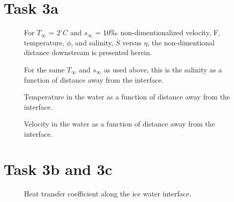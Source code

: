 \section*{Task 3a} %
\label{sec:Task 3a}
	
	\begin{figure}[h]
		\begin{center}
			\newlength\figureheight 
			\newlength\figurewidth 
			\setlength\figureheight{6cm} 
			\setlength\figurewidth{9cm} 
			
		\end{center}
		\caption{For $T_\infty$ = $2^\circ C$ and $s_\infty$ = $10 \permil$ non-dimentionalized velocity, F, temperature, $\phi$, and salinity, $\bar{S}$ versus $\eta$, the non-dimentional distance downstream is presented herein.}
		\label{fig:etaVsF_phi_S_3a}
	\end{figure}
	
	\begin{figure}[h]
		\begin{center}
			\setlength\figureheight{6cm} 
			\setlength\figurewidth{9cm} 
			
		\end{center}
		\caption{For the same $T_\infty$ and $s_\infty$ as used above, this is the salinity as a function of distance away from the interface.}
		\label{fig:salinity_3a}
	\end{figure}
	
	\begin{figure}[h]
		\begin{center}
			\setlength\figureheight{6cm} 
			\setlength\figurewidth{9cm} 
			
		\end{center}
		\caption{Temperature in the water as a function of distance away from the interface.}
		\label{fig:temperture_3a}
	\end{figure}
	
	\begin{figure}[h]
		\begin{center}
			\setlength\figureheight{6cm} 
			\setlength\figurewidth{9cm} 
			
		\end{center}
		\caption{Velocity in the water as a function of distance away from the interface.}
		\label{fig:salinity_3a}
	\end{figure}
	
\section*{Task 3b and 3c}
	\begin{figure}[h]
		\begin{center}
			\setlength\figureheight{6cm} 
			\setlength\figurewidth{9cm} 
			
		\end{center}
		\caption{Heat transfer coefficient along the ice water interface.}
		\label{fig:temperture_3a}
	\end{figure}
	
